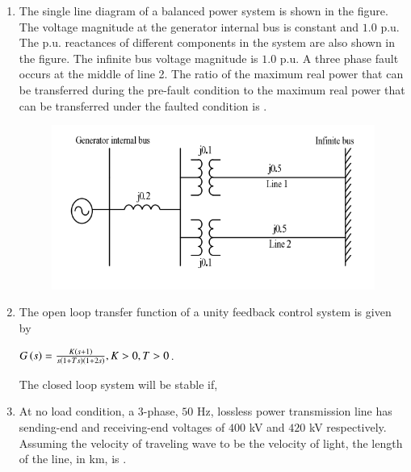 \documentclass[journal,12pt,onecolumn]{IEEEtran}
\theoremstyle{remark}
\begin{document}
\begin{enumerate}[start=1, label=Q.\arabic*]
    \item The single line diagram of a balanced power system is shown in the figure. The voltage magnitude at the generator internal bus is constant and $1.0$ p.u. The p.u. reactances of different components in the system are also shown in the figure. The infinite bus voltage magnitude is $1.0$ p.u. A three phase fault occurs at the middle of line 2. The ratio of the maximum real power that can be transferred during the pre-fault condition to the maximum real power that can be transferred under the faulted condition is \underline{\hspace{2cm}}.
    \begin{figure}[H]
        \includegraphics[width=0.4\columnwidth]{Figures/2q38.png}
        \centering
        \caption{}
    \end{figure}


    \hfill{}

    \item The open loop transfer function of a unity feedback control system is given by \\
    \begin{center}
        
   $G\left(s\right) = \frac{K\left(s+1\right)}{s\left(1+Ts\right)\left(1+2s\right)}, K>0, T>0$.\\
    \end{center}  The closed loop system will be stable if,
    \begin{enumerate}
    \end{enumerate}

    \hfill{}

    \item At no load condition, a 3-phase, $50$ Hz, lossless power transmission line has sending-end and receiving-end voltages of $400$ kV and $420$ kV respectively. Assuming the velocity of traveling wave to be the velocity of light, the length of the line, in km, is \underline{\hspace{2cm}}.


\end{enumerate}
\end{document}
